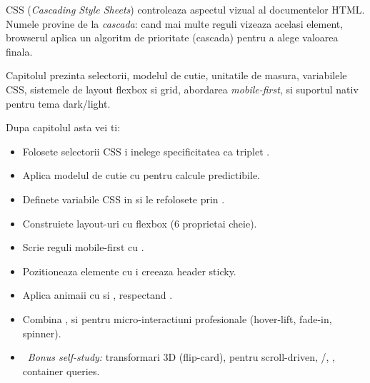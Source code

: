 \clearpage
{}
\setcounter{section}{0}
{}

CSS (\emph{Cascading Style Sheets}) controleaza aspectul vizual al documentelor HTML. Numele provine de la \emph{cascada}: cand mai multe reguli vizeaza acelasi element, browserul aplica un algoritm de prioritate (cascada) pentru a alege valoarea finala.

Capitolul prezinta selectorii, modelul de cutie, unitatile de masura, variabilele CSS, sistemele de layout flexbox si grid, abordarea \emph{mobile-first}, si suportul nativ pentru tema dark/light.

\bigskip

\begin{outcomes}
Dupa capitolul asta vei ti:
\begin{itemize}[itemsep=1pt]
  \item Folosete selectorii CSS i inelege specificitatea ca triplet .
  \item Aplica modelul de cutie cu  pentru calcule predictibile.
  \item Definete variabile CSS in  si le refolosete prin .
  \item Construiete layout-uri cu flexbox (6 proprietai cheie).
  \item Scrie reguli mobile-first cu .
  \item Pozitioneaza elemente cu  i creeaza header sticky.
  \item Aplica animaii cu  si , respectand .
  \item Combina ,  si  pentru micro-interactiuni profesionale (hover-lift, fade-in, spinner).
  \item \faRocket\ \emph{Bonus self-study:} transformari 3D (flip-card),  pentru scroll-driven, /, , container queries.
\end{itemize}
\end{outcomes}

